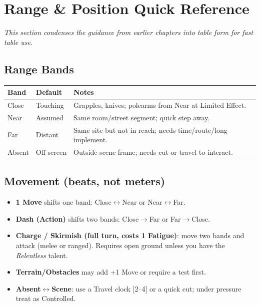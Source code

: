 \section{Range \& Position Quick Reference}
\label{sec:range-position-qr}
\textit{This section condenses the guidance from earlier chapters into table form for fast table use.}

\subsection{Range Bands}
\begin{center}
\begin{longtable}{@{}llp{8.5cm}@{}}
\toprule
\textbf{Band} & \textbf{Default} & \textbf{Notes} \\
\midrule
Close & Touching & Grapples, knives; polearms from Near at Limited Effect. \\
Near  & Assumed  & Same room/street segment; quick step away. \\
Far   & Distant  & Same site but not in reach; needs time/route/long implement. \\
Absent& Off‑screen & Outside scene frame; needs cut or travel to interact. \\
\bottomrule
\end{longtable}
\end{center}

\subsection{Movement (beats, not meters)}
\begin{itemize}
  \item \textbf{1 Move} shifts one band: Close$\leftrightarrow$Near or Near$\leftrightarrow$Far.
  \item \textbf{Dash (Action)} shifts two bands: Close$\rightarrow$Far or Far$\rightarrow$Close.
  \item \textbf{Charge / Skirmish (full turn, costs 1 Fatigue)}: move two bands and attack (melee or ranged). Requires open ground unless you have the \textit{Relentless} talent.
  \item \textbf{Terrain/Obstacles} may add +1 Move or require a test first.
  \item \textbf{Absent$\leftrightarrow$Scene}: use a Travel clock [2--4] or a quick cut; under pressure treat as Controlled.
\end{itemize}

